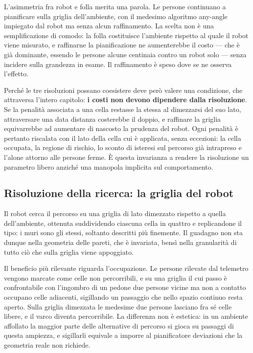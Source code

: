 L'asimmetria fra robot e folla merita una parola. Le persone continuano a pianificare sulla
griglia dell'ambiente, con il medesimo algoritmo any-angle impiegato dal robot ma senza alcun
raffinamento. La scelta non è una semplificazione di comodo: la folla costituisce l'ambiente
rispetto al quale il robot viene misurato, e raffinarne la pianificazione ne aumenterebbe il
costo — che è già dominante, essendo le persone alcune centinaia contro un robot solo — senza
incidere sulla grandezza in esame. Il raffinamento è speso dove se ne osserva l'effetto.

Perché le tre risoluzioni possano coesistere deve però valere una condizione, che attraversa
l'intero capitolo: \textbf{i costi non devono dipendere dalla risoluzione}. Se la penalità
associata a una cella restasse la stessa al dimezzarsi del suo lato, attraversare una data
distanza costerebbe il doppio, e raffinare la griglia equivarrebbe ad aumentare di nascosto la
prudenza del robot. Ogni penalità è pertanto riscalata con il lato della cella cui è applicata,
senza eccezioni: la cella occupata, la regione di rischio, lo sconto di isteresi sul percorso
già intrapreso e l'alone attorno alle persone ferme. È questa invarianza a rendere la
risoluzione un parametro libero anziché una manopola implicita sul comportamento.

\subsection{Risoluzione della ricerca: la griglia del robot}
\label{sec:griglia-robot}

Il robot cerca il percorso su una griglia di lato dimezzato rispetto a quella dell'ambiente,
ottenuta suddividendo ciascuna cella in quattro e replicandone il tipo: i muri sono gli stessi,
soltanto descritti più finemente. Il guadagno non sta dunque nella geometria delle pareti, che è
invariata, bensì nella granularità di tutto ciò che sulla griglia viene appoggiato.

Il beneficio più rilevante riguarda l'occupazione. Le persone rilevate dal telemetro vengono
marcate come celle non percorribili, e su una griglia il cui passo è confrontabile con
l'ingombro di un pedone due persone vicine ma non a contatto occupano celle adiacenti,
sigillando un passaggio che nello spazio continuo resta aperto. Sulla griglia dimezzata le
medesime due persone lasciano fra sé celle libere, e il varco diventa percorribile. La
differenza non è estetica: in un ambiente affollato la maggior parte delle alternative di
percorso si gioca su passaggi di questa ampiezza, e sigillarli equivale a imporre al
pianificatore deviazioni che la geometria reale non richiede.

